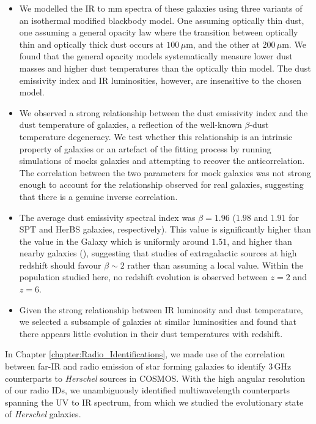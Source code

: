 \begin{itemize}
    \item We modelled the IR to mm spectra of these galaxies using three variants of an isothermal modified blackbody model. One assuming optically thin dust, one assuming a general opacity law where the transition between optically thin and optically thick dust occurs at $100\,\mu$m, and the other at $200\,\mu$m. We found that the general opacity models systematically measure lower dust masses and higher dust temperatures than the optically thin model. The dust emissivity index and IR luminosities, however, are insensitive to the chosen model.
    \item We observed a strong relationship between the dust emissivity index and the dust temperature of galaxies, a reflection of the well-known $\beta$-dust temperature degeneracy. We test whether this relationship is an intrinsic property of galaxies or an artefact of the fitting process by running simulations of mocks galaxies and attempting to recover the anticorrelation. The correlation between the two parameters for mock galaxies was not strong enough to account for the relationship observed for real galaxies, suggesting that there is a genuine inverse correlation.
    \item The average dust emissivity spectral index was $\beta = 1.96$ ($1.98$ and $1.91$ for SPT and HerBS galaxies, respectively). This value is significantly higher than the value in the Galaxy which is uniformly around $1.51$, and higher than nearby galaxies (\citealt{Lamperti_2019}), suggesting that studies of extragalactic sources at high redshift should favour $\beta \sim 2$ rather than assuming a local value. Within the population studied here, no redshift evolution is observed between $z = 2$ and $z = 6$.
    \item Given the strong relationship between IR luminosity and dust temperature, we selected a subsample of galaxies at similar luminosities and found that there appears little evolution in their dust temperatures with redshift.
\end{itemize}

In Chapter \ref{chapter:Radio_Identifications}, we made use of the correlation between far-IR and radio emission of star forming galaxies to identify $3\,$GHz counterparts to \textit{Herschel} sources in COSMOS. With the high angular resolution of our radio IDs, we unambiguously identified multiwavelength counterparts spanning the UV to IR spectrum, from which we studied the evolutionary state of \textit{Herschel} galaxies.

